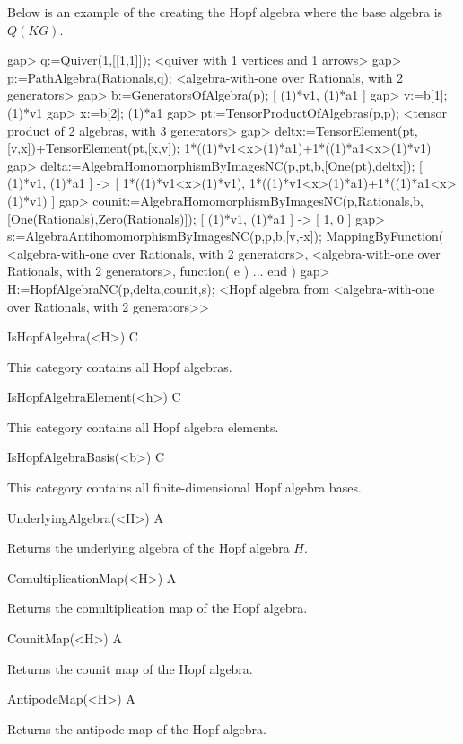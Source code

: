 Below is an example of the creating the Hopf algebra where the base algebra is $Q(KG)$.

\beginexample
gap> q:=Quiver(1,[[1,1]]);
<quiver with 1 vertices and 1 arrows>
gap> p:=PathAlgebra(Rationals,q);
<algebra-with-one over Rationals, with 2 generators>
gap> b:=GeneratorsOfAlgebra(p);
[ (1)*v1, (1)*a1 ]
gap> v:=b[1]; 
(1)*v1
gap> x:=b[2];
(1)*a1
gap> pt:=TensorProductOfAlgebras(p,p);
<tensor product of 2 algebras, with 3 generators>
gap> deltx:=TensorElement(pt,[v,x])+TensorElement(pt,[x,v]); 
1*((1)*v1<x>(1)*a1)+1*((1)*a1<x>(1)*v1)
gap> delta:=AlgebraHomomorphismByImagesNC(p,pt,b,[One(pt),deltx]);
[ (1)*v1, (1)*a1 ] -> 
[ 1*((1)*v1<x>(1)*v1), 1*((1)*v1<x>(1)*a1)+1*((1)*a1<x>(1)*v1) ]
gap> counit:=AlgebraHomomorphismByImagesNC(p,Rationals,b,[One(Rationals),Zero(Rationals)]);
[ (1)*v1, (1)*a1 ] -> [ 1, 0 ]
gap> s:=AlgebraAntihomomorphismByImagesNC(p,p,b,[v,-x]);
MappingByFunction( <algebra-with-one over Rationals, with 
2 generators>, <algebra-with-one over Rationals, with 
2 generators>, function( e ) ... end )
gap> H:=HopfAlgebraNC(p,delta,counit,s);
<Hopf algebra from <algebra-with-one over Rationals, with 2 generators>>
\endexample


\>IsHopfAlgebra(<H>) C

This category contains all Hopf algebras.

\>IsHopfAlgebraElement(<h>) C

This category contains all Hopf algebra elements.

\>IsHopfAlgebraBasis(<b>) C

This category contains all finite-dimensional Hopf algebra bases.

\>UnderlyingAlgebra(<H>) A

Returns the underlying algebra of the Hopf algebra $H$.

\>ComultiplicationMap(<H>) A

Returns the comultiplication map of the Hopf algebra.

\>CounitMap(<H>) A

Returns the counit map of the Hopf algebra.

\>AntipodeMap(<H>) A

Returns the antipode map of the Hopf algebra.


